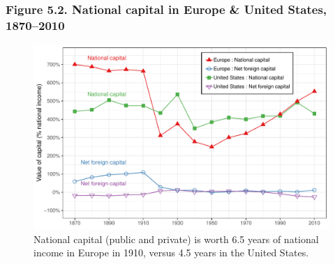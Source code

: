 \documentclass[t]{beamer}\usepackage[]{graphicx}\usepackage[]{color}
\newenvironment{knitrout}{}{} %
\begin{document}
\begin{frame}[label=Figure_5_2]
\frametitle{Figure 5.2. National capital in Europe \& United States, 1870--2010}
\begin{figure}[t]
\begin{minipage}[b]{\textwidth}
\centering
\begin{knitrout}\footnotesize
{}\color{fgcolor}

{\centering \includegraphics[width=1\linewidth]{figures/color/Figure_5_2} 

}



\end{knitrout}
\caption{National capital (public and private) is worth 6.5 years of national income in Europe in 1910, versus 4.5 years in the United States.}
\end{minipage}
\end{figure}
\end{frame}
\end{document}

